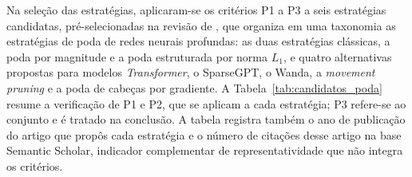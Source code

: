 Na seleção das estratégias, aplicaram-se os critérios P1 a P3
a seis estratégias candidatas,
pré-selecionadas na revisão de , que organiza em uma taxonomia as
estratégias de poda de redes neurais profundas: as duas estratégias clássicas, a poda por
magnitude e a poda estruturada por norma $L_1$, e quatro alternativas propostas para modelos
\textit{Transformer}, o SparseGPT, o Wanda, a \textit{movement pruning} \cite{Sanh2020} e a
poda de cabeças por gradiente. A Tabela~\ref{tab:candidatos_poda} resume a verificação de P1
e P2, que se aplicam a cada estratégia; P3 refere-se ao conjunto e é tratado na conclusão. A
tabela registra também o ano de publicação do artigo que propôs cada estratégia e o número
de citações desse artigo na base Semantic Scholar, indicador complementar de
representatividade que não integra os critérios.

